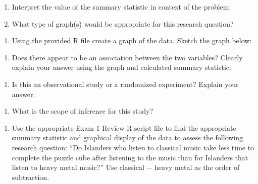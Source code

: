 \documentclass[
]{report}
\providecommand{\tightlist}{%
  \setlength{\itemsep}{0pt}\setlength{\parskip}{0pt}}
\begin{document}
\newpage

\begin{enumerate}
\def\labelenumi{\alph{enumi}.}
\setcounter{enumi}{4}
\item
  Interpret the value of the summary statistic in context of the problem:
  \vspace{0.5in}
\item
  What type of graph(s) would be appropriate for this research question?
\end{enumerate}

\vspace{0.2in}

\begin{enumerate}
\def\labelenumi{\alph{enumi}.}
\setcounter{enumi}{6}
\tightlist
\item
  Using the provided R file create a graph of the data. Sketch the graph below:
\end{enumerate}

\vspace{2in}

\begin{enumerate}
\def\labelenumi{\alph{enumi}.}
\setcounter{enumi}{7}
\tightlist
\item
  Does there appear to be an association between the two variables? Clearly explain your answer using the graph and calculated summary statistic.
\end{enumerate}

\vspace{0.8in}

\begin{enumerate}
\def\labelenumi{\roman{enumi}.}
\tightlist
\item
  Is this an observational study or a randomized experiment? Explain your answer.
\end{enumerate}

\vspace{0.5in}

\begin{enumerate}
\def\labelenumi{\alph{enumi}.}
\setcounter{enumi}{9}
\tightlist
\item
  What is the scope of inference for this study?
\end{enumerate}

\newpage

\begin{enumerate}
\def\labelenumi{\arabic{enumi}.}
\setcounter{enumi}{4}
\tightlist
\item
  Use the appropriate Exam 1 Review R script file to find the appropriate summary statistic and graphical display of the data to assess the following research question: ``Do Islanders who listen to classical music take less time to complete the puzzle cube after listening to the music than for Islanders that listen to heavy metal music?'' Use classical \(-\) heavy metal as the order of subtraction.
\end{enumerate}
\end{document}
